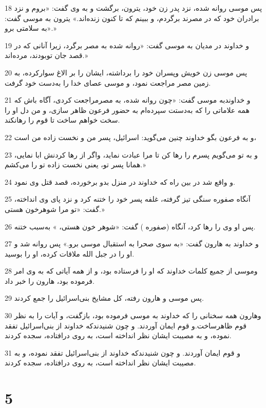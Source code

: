 \par 18 پس موسی روانه شده، نزد پدر زن خود، یترون، برگشت و به وی گفت: «بروم و نزد برادران خود که در مصرند برگردم، و ببینم که تا کنون زنده‌اند.» یترون به موسی گفت: «به سلامتی برو.»
\par 19 و خداوند در مدیان به موسی گفت: «روانه شده به مصر برگرد، زیرا آنانی که در قصد جان توبودند، مرده‌اند.»
\par 20 پس موسی زن خویش وپسران خود را برداشته، ایشان را بر الاغ سوارکرده، به زمین مصر مراجعت نمود، و موسی عصای خدا را به‌دست خود گرفت.
\par 21 و خداوندبه موسی گفت: «چون روانه شده، به مصرمراجعت کردی، آگاه باش که همه علاماتی را که به‌دستت سپرده‌ام به حضور فرعون ظاهر سازی، و من دل او را سخت خواهم ساخت تا قوم را رهانکند.
\par 22 و به فرعون بگو خداوند چنین می‌گوید: اسرائیل، پسر من و نخست زاده من است،
\par 23 و به تو می‌گویم پسرم را رها کن تا مرا عبادت نماید، واگر از رها کردنش ابا نمایی، همانا پسر تو، یعنی نخست زاده تو را می‌کشم.»
\par 24 و واقع شد در بین راه که خداوند در منزل بدو برخورده، قصد قتل وی نمود.
\par 25 آنگاه صفوره سنگی تیز گرفته، غلفه پسر خود را ختنه کرد و نزد پای وی انداخته، گفت: «تو مرا شوهرخون هستی.»
\par 26 پس او وی را رها کرد، آنگاه (صفوره ) گفت: «شوهر خون هستی، » به‌سبب ختنه.
\par 27 و خداوند به هارون گفت: «به سوی صحرا به استقبال موسی برو.» پس روانه شد و او را در جبل الله ملاقات کرده، او را بوسید.
\par 28 وموسی از جمیع کلمات خداوند که او را فرستاده بود، و از همه آیاتی که به وی امر فرموده بود، هارون را خبر داد.
\par 29 پس موسی و هارون رفته، کل مشایخ بنی‌اسرائیل را جمع کردند.
\par 30 وهارون همه سخنانی را که خداوند به موسی فرموده بود، باز‌گفت، و آیات را به نظر قوم ظاهرساخت.و قوم ایمان آوردند. و چون شنیدندکه خداوند از بنی‌اسرائیل تفقد نموده، و به مصیبت ایشان نظر انداخته است، به روی درافتاده، سجده کردند.
\par 31 و قوم ایمان آوردند. و چون شنیدندکه خداوند از بنی‌اسرائیل تفقد نموده، و به مصیبت ایشان نظر انداخته است، به روی درافتاده، سجده کردند.
 
\chapter{5}

